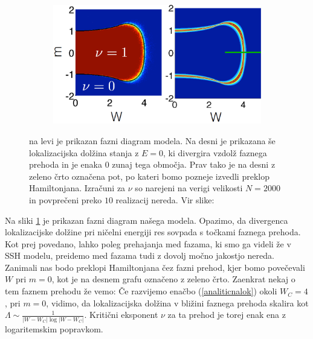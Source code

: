 \begin{figure}[H]
\centering
\begin{subfigure}{.7\textwidth}
\includegraphics[width=\linewidth]{Figures/CriticalSurface.png}
\end{subfigure}
\caption{na levi je prikazan fazni diagram modela. Na desni je prikazana še lokalizacijska dolžina stanja z $E=0$, ki divergira vzdolž faznega prehoda in je enaka $0$ zunaj tega območja. Prav tako je na desni z zeleno črto označena pot, po kateri bomo pozneje izvedli preklop Hamiltonjana. Izračuni za $\nu$ so narejeni na verigi velikosti $N=2000$ in povprečeni preko $10$ realizacij nereda. Vir slike: \cite{mondragon}}
\label{fig:CriticalSurface}
\end{figure}

Na sliki \ref{fig:CriticalSurface} je prikazan fazni diagram našega modela. Opazimo, da divergenca lokalizacijske dolžine pri ničelni energiji res sovpada s točkami faznega prehoda. Kot prej povedano, lahko poleg prehajanja med fazama, ki smo ga videli že v SSH modelu, preidemo med fazama tudi z dovolj močno jakostjo nereda. Zanimali nas bodo preklopi Hamiltonjana čez fazni prehod, kjer bomo povečevali $W$ pri $m=0$, kot je na desnem grafu označeno z zeleno črto.
Zaenkrat nekaj o tem faznem prehodu že vemo: Če razvijemo enačbo (\ref{analiticnalok}) okoli $W_C=4$, pri $m=0$, vidimo, da lokalizacijska dolžina v bližini faznega prehoda skalira kot $\Lambda \sim \frac{1}{|W-W_C| \log |W-W_C|}$. Kritični eksponent $\nu$ za ta prehod je torej enak ena z logaritemskim popravkom.

